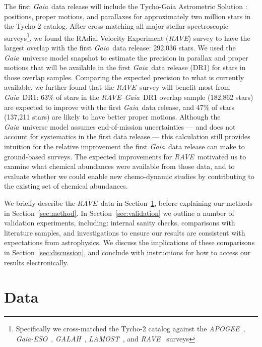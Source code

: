 \documentclass[preprint,trackchanges]{aastex}
\newcommand{\acronym}[1]{{\small{#1}}}
\newcommand{\project}[1]{\textsl{#1}}
\newcommand{\gaia}{\project{Gaia}}
\newcommand{\rave}{\project{\acronym{RAVE}}}
\newcommand{\galah}{\project{\acronym{GALAH}}}
\newcommand{\ges}{\project{Gaia-ESO}}
\newcommand{\apogee}{\project{\acronym{APOGEE}}}
\newcommand{\lamost}{\project{\acronym{LAMOST}}}
\newcommand{\tgas}{\project{\acronym{TGAS}}}
\begin{document}
The first \gaia\ data release will include the Tycho-Gaia Astrometric Solution
\citep[hereafter \tgas;][]{Michalik_2015a,Michalik_2015b}: positions, proper 
motions, and parallaxes for approximately two million stars in the Tycho-2 
\citep{Hog_2000} catalog.  After cross-matching all major stellar spectroscopic 
surveys\footnote{Specifically we cross-matched the Tycho-2 catalog against the 
\apogee\ \citep{Zasowski_2013}, \ges\ \citep{Gilmore_2012,Randich_2013}, 
\galah\ \citep{DeSilva_2015}, \lamost\ \citep{Cui_2012}, and \rave\ 
\citep{Steinmetz_2006} surveys}, we found the RAdial Velocity Experiment 
(\rave) survey to have the largest overlap with the first \gaia\ data release: 
292,036 stars.  We used the \gaia\ universe model snapshot 
\citep{Robin_2012} to estimate the precision in parallax and proper motions that
will be available in the first \gaia\ data release (DR1) for stars in those 
overlap samples.  Comparing the expected precision to what is currently available, 
we further found that the \rave\ survey will benefit most from \gaia\ DR1: 63\%
of stars in the \rave--\gaia\ DR1 overlap sample (182,862 stars) are 
expected to improve with the first \gaia\ data release, and 47\% of stars (137,211 stars) are 
likely to have better proper motions.  Although the \gaia\ universe
model assumes end-of-mission uncertainties --- and does not account for systematics
in the first data release --- this calculation still provides intuition for the 
relative improvement the first \gaia\ data release can make to ground-based surveys.  
The expected improvements for \rave\ motivated us to examine what chemical abundances
were available from those data, and to evaluate whether we could enable new 
chemo-dynamic studies by contributing to the existing set of chemical abundances.


We briefly describe the \rave\ data in Section~\ref{sec:data}, before explaining
our methods in Section~\ref{sec:method}.  In Section~\ref{sec:validation}
we outline a number of validation experiments, including: internal sanity checks,
comparisons with literature samples, and investigations to ensure our results
are consistent with expectations from astrophysics.  We discuss the implications
of these comparisons in Section~\ref{sec:discussion}, and conclude with instructions
for how to access our results electronically.


\section{Data}
\label{sec:data}
\end{document}
